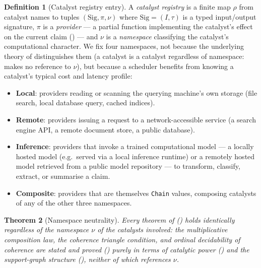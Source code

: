 \documentclass[11pt,twocolumn,a4paper]{article}
\theoremstyle{thmstyle}
\newtheorem{theorem}{Theorem}[section]
\theoremstyle{definition}
\newtheorem{definition}[theorem]{Definition}
\theoremstyle{remark}
\begin{document}
\begin{definition}[Catalyst registry entry]
\label{def:registry}
A \emph{catalyst registry} is a finite map $\rho$ from catalyst names to
tuples $(\mathrm{Sig},\pi,\nu)$ where $\mathrm{Sig}=(I,\tau)$ is a typed
input/output signature, $\pi$ is a \emph{provider} --- a partial function
implementing the catalyst's effect on the current claim
() --- and $\nu$ is a \emph{namespace} classifying the
catalyst's computational character. We fix four namespaces, not because
the underlying theory of  distinguishes them (a
catalyst is a catalyst regardless of namespace:  makes no
reference to $\nu$), but because a scheduler benefits from knowing a
catalyst's typical cost and latency profile:
\begin{itemize}[leftmargin=1.4em,itemsep=1pt]
\item \textbf{Local}: providers reading or scanning the querying machine's
  own storage (file search, local database query, cached indices).
\item \textbf{Remote}: providers issuing a request to a network-accessible
  service (a search engine API, a remote document store, a public
  database).
\item \textbf{Inference}: providers that invoke a trained computational
  model --- a locally hosted model (e.g.\ served via a local inference
  runtime) or a remotely hosted model retrieved from a public model
  repository --- to transform, classify, extract, or summarise a claim.
\item \textbf{Composite}: providers that are themselves \texttt{Chain}
  values, composing catalysts of any of the other three namespaces.
\end{itemize}
\end{definition}

\begin{theorem}[Namespace neutrality]
\label{thm:namespace-neutral}
Every theorem of  () holds identically
regardless of the namespace $\nu$ of the catalysts involved: the
multiplicative composition law, the coherence triangle condition, and
ordinal decidability of coherence are stated and proved
() purely in terms of catalytic power
() and the support-graph structure (),
neither of which references $\nu$.
\end{theorem}
\end{document}
